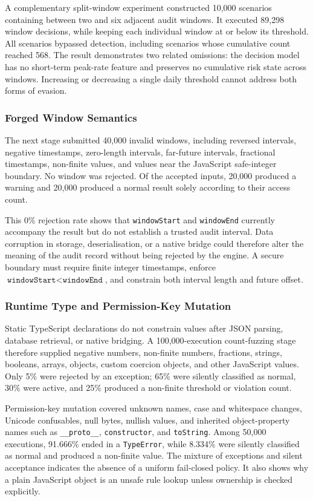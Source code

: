 A complementary split-window experiment constructed 10,000 scenarios containing between two and six adjacent audit windows. It executed 89,298 window decisions, while keeping each individual window at or below its threshold. All scenarios bypassed detection, including scenarios whose cumulative count reached 568. The result demonstrates two related omissions: the decision model has no short-term peak-rate feature and preserves no cumulative risk state across windows. Increasing or decreasing a single daily threshold cannot address both forms of evasion.

\subsubsection{Forged Window Semantics}

The next stage submitted 40,000 invalid windows, including reversed intervals, negative timestamps, zero-length intervals, far-future intervals, fractional timestamps, non-finite values, and values near the JavaScript safe-integer boundary. No window was rejected. Of the accepted inputs, 20,000 produced a warning and 20,000 produced a normal result solely according to their access count.

This 0\% rejection rate shows that \texttt{windowStart} and \texttt{windowEnd} currently accompany the result but do not establish a trusted audit interval. Data corruption in storage, deserialisation, or a native bridge could therefore alter the meaning of the audit record without being rejected by the engine. A secure boundary must require finite integer timestamps, enforce \(\texttt{windowStart}<\texttt{windowEnd}\), and constrain both interval length and future offset.

\subsubsection{Runtime Type and Permission-Key Mutation}

Static TypeScript declarations do not constrain values after JSON parsing, database retrieval, or native bridging. A 100,000-execution count-fuzzing stage therefore supplied negative numbers, non-finite numbers, fractions, strings, booleans, arrays, objects, custom coercion objects, and other JavaScript values. Only 5\% were rejected by an exception; 65\% were silently classified as normal, 30\% were active, and 25\% produced a non-finite threshold or violation count.

Permission-key mutation covered unknown names, case and whitespace changes, Unicode confusables, null bytes, nullish values, and inherited object-property names such as \texttt{\_\_proto\_\_}, \texttt{constructor}, and \texttt{toString}. Among 50,000 executions, 91.666\% ended in a \texttt{TypeError}, while 8.334\% were silently classified as normal and produced a non-finite value. The mixture of exceptions and silent acceptance indicates the absence of a uniform fail-closed policy. It also shows why a plain JavaScript object is an unsafe rule lookup unless ownership is checked explicitly.

